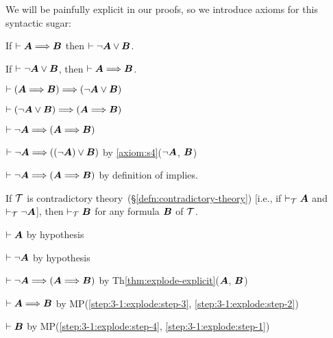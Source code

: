 We will be painfully explicit in our proofs, so we introduce axioms for
this syntactic sugar:
\begin{syn}\label{unfold-implies}%
If $\vdash\boldsymbol{A}\Longrightarrow\boldsymbol{B}$
then $\vdash\neg\boldsymbol{A}\lor\boldsymbol{B}$.
\end{syn}

\begin{syn}\label{fold-implies}%
If $\vdash\neg\boldsymbol{A}\lor\boldsymbol{B}$,
then $\vdash\boldsymbol{A}\Longrightarrow\boldsymbol{B}$.
\end{syn}

\begin{syn}\label{syn:tautology:implies-to-lor}%
$\vdash(\boldsymbol{A}\Longrightarrow\boldsymbol{B})\Longrightarrow(\neg\boldsymbol{A}\lor\boldsymbol{B})$
\end{syn}

\begin{syn}\label{syn:tautology:lor-to-implies}%
$\vdash(\neg\boldsymbol{A}\lor\boldsymbol{B})\Longrightarrow(\boldsymbol{A}\Longrightarrow\boldsymbol{B})$
\end{syn}

\begin{theorem}\label{thm:explode-explicit}%
$\vdash\neg\boldsymbol{A}\Longrightarrow(\boldsymbol{A}\Longrightarrow\boldsymbol{B})$
\end{theorem}

\begin{pf}
\item\label{thm:3-1-3:step1}\Pf $\vdash\neg\boldsymbol{A}\Longrightarrow((\neg\boldsymbol{A})\lor\boldsymbol{B})$
by \ref{axiom:s4}($\neg\boldsymbol{A}$, $\boldsymbol{B}$)
\item $\vdash\neg\boldsymbol{A}\Longrightarrow(\boldsymbol{A}\Longrightarrow\boldsymbol{B})$
by definition of implies.
\end{pf}

\begin{theorem}\label{thm:explode}%
If $\mathcal{T}$ is contradictory theory~(\S\ref{defn:contradictory-theory})
[i.e., if $\vdash_{\mathcal{T}}\boldsymbol{A}$ and $\vdash_{\mathcal{T}}\neg\boldsymbol{A}$],
then $\vdash_{\mathcal{T}}\boldsymbol{B}$ for any formula $\boldsymbol{B}$
of $\mathcal{T}$.
\end{theorem}

\begin{pf}
\item\label{step:3-1:explode:step-1}\Pf $\vdash\boldsymbol{A}$ by hypothesis
\item\label{step:3-1:explode:step-2} $\vdash\neg\boldsymbol{A}$ by hypothesis
\item\label{step:3-1:explode:step-3} $\vdash\neg\boldsymbol{A}\Longrightarrow(\boldsymbol{A}\Longrightarrow\boldsymbol{B})$
  by Th\ref{thm:explode-explicit}($\boldsymbol{A}$, $\boldsymbol{B}$)
\item\label{step:3-1:explode:step-4} $\vdash\boldsymbol{A}\Longrightarrow\boldsymbol{B}$ by MP(\ref{step:3-1:explode:step-3}, \ref{step:3-1:explode:step-2})
\item $\vdash\boldsymbol{B}$ by MP(\ref{step:3-1:explode:step-4}, \ref{step:3-1:explode:step-1})
\end{pf}

